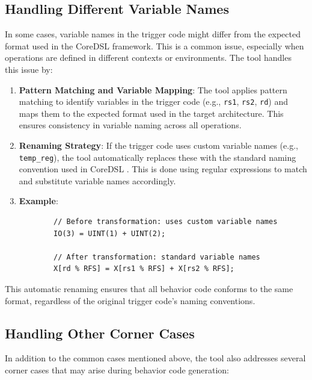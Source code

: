 \subsection{Handling Different Variable Names}

In some cases, variable names in the trigger code might differ from the expected format used in the CoreDSL framework. This is a common issue, especially when operations are defined in different contexts or environments. The tool handles this issue by:

\begin{enumerate}
    \item \textbf{Pattern Matching and Variable Mapping}: The tool applies pattern matching to identify variables in the trigger code (e.g., \texttt{rs1}, \texttt{rs2}, \texttt{rd}) and maps them to the expected format used in the target architecture. This ensures consistency in variable naming across all operations.

    \item \textbf{Renaming Strategy}: If the trigger code uses custom variable names (e.g., \texttt{temp\_reg}), the tool automatically replaces these with the standard naming convention used in CoreDSL . This is done using regular expressions to match and substitute variable names accordingly.

    \item \textbf{Example}:
    \begin{lstlisting}
        // Before transformation: uses custom variable names
        IO(3) = UINT(1) + UINT(2);

        // After transformation: standard variable names
        X[rd % RFS] = X[rs1 % RFS] + X[rs2 % RFS];
    \end{lstlisting}
\end{enumerate}

This automatic renaming ensures that all behavior code conforms to the same format, regardless of the original trigger code's naming conventions.

\subsection{Handling Other Corner Cases}

In addition to the common cases mentioned above, the tool also addresses several corner cases that may arise during behavior code generation:

